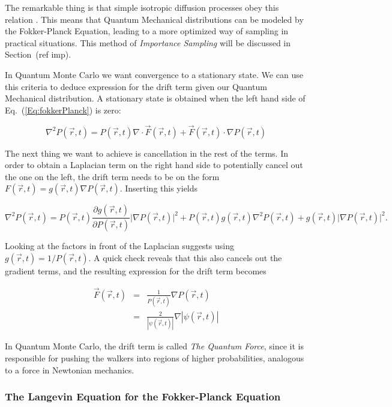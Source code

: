 The remarkable thing is that simple isotropic diffusion processes obey this relation \cite{abInitioMC}. This means that Quantum Mechanical distributions can be modeled by the Fokker-Planck Equation, leading to a more optimized way of sampling in practical situations. This method of \textit{Importance Sampling} will be discussed in Section~(ref imp). 

In Quantum Monte Carlo we want convergence to a stationary state. We can use this criteria to deduce expression for the drift term given our Quantum Mechanical distribution. A stationary state is obtained when the left hand side of Eq.~(\ref{Eq:fokkerPlanck}) is zero:

\begin{equation*}
 \nabla^2 P(\vec r, t) = P(\vec r, t)\nabla\cdot\vec F(\vec r, t) + \vec F(\vec r, t) \cdot \nabla P(\vec r, t)
\end{equation*}

The next thing we want to achieve is cancellation in the rest of the terms. In order to obtain a Laplacian term on the right hand side to potentially cancel out the one on the left, the drift term needs to be on the form $F(\vec r, t) = g(\vec r, t)\nabla P(\vec r, t)$. Inserting this yields

\begin{equation*}
  \nabla^2 P(\vec r, t) = P(\vec r, t)\frac{\partial g(\vec r, t)}{\partial P(\vec r, t)}\Big|\nabla P(\vec r, t)\Big|^2
  + P(\vec r, t)g(\vec r, t)\nabla^2 P(\vec r, t) + g(\vec r, t) \Big|\nabla P(\vec r, t)\Big|^2.
\end{equation*}

Looking at the factors in front of the Laplacian suggests using $g(\vec r, t) = 1/P(\vec r, t)$. A quick check reveals that this also cancels out the gradient terms, and the resulting expression for the drift term becomes

\begin{eqnarray}
 \vec F(\vec r, t) &=& \frac{1}{P(\vec r, t)}\nabla P(\vec r, t) \nonumber \\
                   &=& \frac{2}{|\psi(\vec r, t)|}\nabla |\psi(\vec r, t)|
\end{eqnarray}

In Quantum Monte Carlo, the drift term is called \textit{The Quantum Force}, since it is responsible for pushing the walkers into regions of higher probabilities, analogous to a force in Newtonian mechanics.

\subsubsection{The Langevin Equation for the Fokker-Planck Equation}

